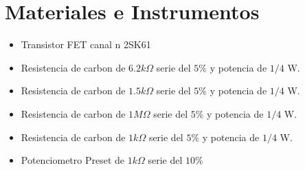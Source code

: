 \documentclass[12pt, a4paper]{article}
\begin{document}
    \newpage

    \section{Materiales e Instrumentos}


    \begin{itemize}
        \item Transistor FET canal n 2SK61
        \item Resistencia de carbon de $6.2k\Omega$  serie del $5\%$ y potencia de $1/4$ W.
        \item Resistencia de carbon de $1.5k\Omega$  serie del $5\%$ y potencia de $1/4$ W.
        \item Resistencia de carbon de $1M\Omega$  serie del $5\%$ y potencia de $1/4$ W.
        \item Resistencia de carbon de $1k\Omega$  serie del $5\%$ y potencia de $1/4$ W.
        \item Potenciometro Preset de $1k\Omega$  serie del $10\%$
    \end{itemize}
\end{document}
